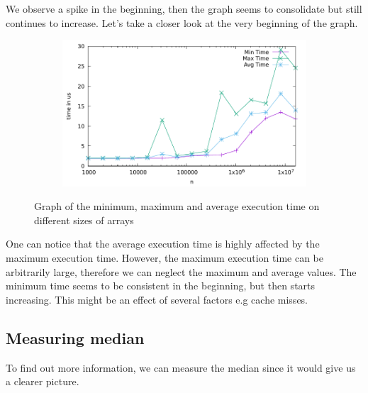 \documentclass[a4paper,11pt]{article}
\begin{document}
We observe a spike in the beginning, then the graph seems to consolidate but still continues to increase.
Let's take a closer look at the very beginning of the graph.

\begin{figure}[h]
  \centering
  \begin{subfigure}[b]{.5\textwidth}
    \centering
    \includegraphics[width=\textwidth]{./graph_1/data_2} %
  \end{subfigure}
  \caption{Graph of the minimum, maximum and average execution time on different sizes of arrays}
  \label{fig:graph_2}
\end{figure}

One can notice that the average execution time is highly affected by the maximum execution time.
However, the maximum execution time can be arbitrarily large, therefore we can neglect the maximum and average values.
The minimum time seems to be consistent in the beginning, but then starts increasing.
This might be an effect of several factors e.g cache misses.

\subsection*{Measuring median}

To find out more information, we can measure the median since it would give us a clearer picture.
\end{document}
